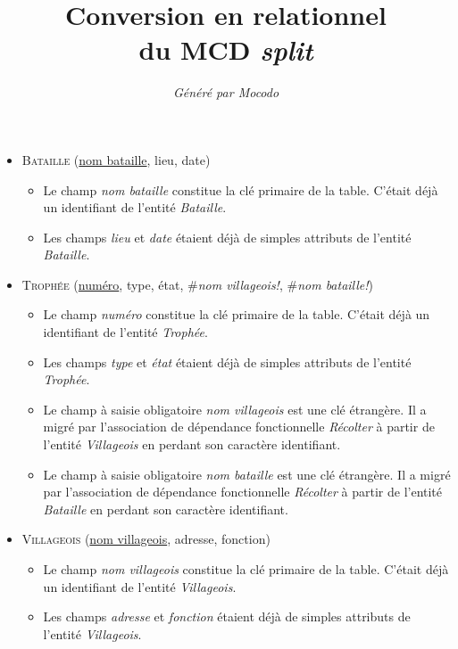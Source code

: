 \documentclass[a4paper]{article}
\title{Conversion en relationnel\\du MCD \emph{split}}
\author{\emph{Généré par Mocodo}}
\newcommand{\relat}[1]{\textsc{#1}}
\newcommand{\attr}[1]{#1}
\newcommand{\prim}[1]{\uline{#1}}
\newcommand{\foreign}[1]{\#\textsl{#1}}
\begin{document}
\maketitle

\begin{itemize}
  \item \relat{Bataille} (\prim{nom bataille}, \attr{lieu}, \attr{date})
  \begin{itemize}
    \item Le champ \emph{nom bataille} constitue la clé primaire de la table. C'était déjà un identifiant de l'entité \emph{Bataille}.
    \item Les champs \emph{lieu} et \emph{date} étaient déjà de simples attributs de l'entité \emph{Bataille}.
  \end{itemize}

  \item \relat{Trophée} (\prim{numéro}, \attr{type}, \attr{état}, \foreign{nom villageois!}, \foreign{nom bataille!})
  \begin{itemize}
    \item Le champ \emph{numéro} constitue la clé primaire de la table. C'était déjà un identifiant de l'entité \emph{Trophée}.
    \item Les champs \emph{type} et \emph{état} étaient déjà de simples attributs de l'entité \emph{Trophée}.
    \item Le champ à saisie obligatoire \emph{nom villageois} est une clé étrangère. Il a migré par l'association de dépendance fonctionnelle \emph{Récolter} à partir de l'entité \emph{Villageois} en perdant son caractère identifiant.
    \item Le champ à saisie obligatoire \emph{nom bataille} est une clé étrangère. Il a migré par l'association de dépendance fonctionnelle \emph{Récolter} à partir de l'entité \emph{Bataille} en perdant son caractère identifiant.
  \end{itemize}

  \item \relat{Villageois} (\prim{nom villageois}, \attr{adresse}, \attr{fonction})
  \begin{itemize}
    \item Le champ \emph{nom villageois} constitue la clé primaire de la table. C'était déjà un identifiant de l'entité \emph{Villageois}.
    \item Les champs \emph{adresse} et \emph{fonction} étaient déjà de simples attributs de l'entité \emph{Villageois}.
  \end{itemize}

\end{itemize}
\end{document}
